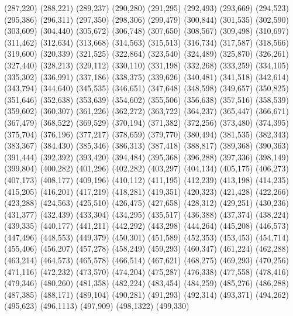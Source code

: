 (287,220)
(288,221)
(289,237)
(290,280)
(291,295)
(292,493)
(293,669)
(294,523)
(295,386)
(296,311)
(297,350)
(298,306)
(299,479)
(300,844)
(301,535)
(302,590)
(303,609)
(304,440)
(305,672)
(306,748)
(307,650)
(308,567)
(309,498)
(310,697)
(311,462)
(312,634)
(313,668)
(314,563)
(315,513)
(316,734)
(317,587)
(318,566)
(319,600)
(320,339)
(321,525)
(322,864)
(323,540)
(324,489)
(325,870)
(326,261)
(327,440)
(328,213)
(329,112)
(330,110)
(331,198)
(332,268)
(333,259)
(334,105)
(335,302)
(336,991)
(337,186)
(338,375)
(339,626)
(340,481)
(341,518)
(342,614)
(343,794)
(344,640)
(345,535)
(346,651)
(347,648)
(348,598)
(349,657)
(350,825)
(351,646)
(352,638)
(353,639)
(354,602)
(355,506)
(356,638)
(357,516)
(358,539)
(359,602)
(360,307)
(361,226)
(362,272)
(363,722)
(364,237)
(365,447)
(366,671)
(367,479)
(368,522)
(369,529)
(370,194)
(371,382)
(372,256)
(373,480)
(374,395)
(375,704)
(376,196)
(377,217)
(378,659)
(379,770)
(380,494)
(381,535)
(382,343)
(383,367)
(384,430)
(385,346)
(386,313)
(387,418)
(388,817)
(389,368)
(390,363)
(391,444)
(392,392)
(393,420)
(394,484)
(395,368)
(396,288)
(397,336)
(398,149)
(399,804)
(400,282)
(401,296)
(402,282)
(403,297)
(404,134)
(405,175)
(406,273)
(407,173)
(408,177)
(409,196)
(410,112)
(411,195)
(412,239)
(413,198)
(414,235)
(415,205)
(416,201)
(417,219)
(418,281)
(419,351)
(420,323)
(421,428)
(422,266)
(423,288)
(424,563)
(425,510)
(426,475)
(427,658)
(428,312)
(429,251)
(430,236)
(431,377)
(432,439)
(433,304)
(434,295)
(435,517)
(436,388)
(437,374)
(438,224)
(439,335)
(440,177)
(441,211)
(442,292)
(443,298)
(444,264)
(445,208)
(446,573)
(447,496)
(448,553)
(449,379)
(450,301)
(451,589)
(452,353)
(453,453)
(454,714)
(455,406)
(456,207)
(457,278)
(458,249)
(459,293)
(460,347)
(461,224)
(462,288)
(463,214)
(464,573)
(465,578)
(466,514)
(467,621)
(468,275)
(469,293)
(470,256)
(471,116)
(472,232)
(473,570)
(474,204)
(475,287)
(476,338)
(477,558)
(478,416)
(479,346)
(480,260)
(481,358)
(482,224)
(483,454)
(484,259)
(485,276)
(486,288)
(487,385)
(488,171)
(489,104)
(490,281)
(491,293)
(492,314)
(493,371)
(494,262)
(495,623)
(496,1113)
(497,909)
(498,1322)
(499,330)
